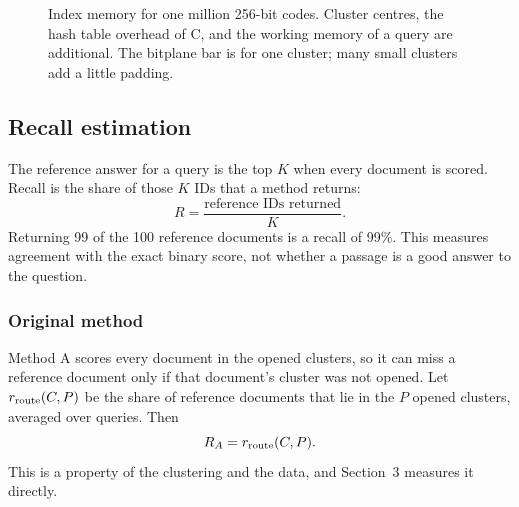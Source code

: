 \begin{figure}[H]\centering
{}
\caption{Index memory for one million 256-bit codes. Cluster centres, the hash table
overhead of C, and the working memory of a query are additional. The bitplane bar is for one
cluster; many small clusters add a little padding.}
\label{fig:memory}
\end{figure}

\subsection{Recall estimation}
The reference answer for a query is the top $K$ when every document is scored. Recall is
the share of those $K$ IDs that a method returns:
\[
 R=\frac{\text{reference IDs returned}}{K}.
\]
Returning 99 of the 100 reference documents is a recall of 99\%. This measures agreement
with the exact binary score, not whether a passage is a good answer to the question.

\subsubsection{Original method}
Method A scores every document in the opened clusters, so it can miss a reference document
only if that document's cluster was not opened. Let $r_{\rm route}(C,P)$ be the share of
reference documents that lie in the $P$ opened clusters, averaged over queries. Then
\[
 R_A=r_{\rm route}(C,P).
\]
This is a property of the clustering and the data, and Section~3 measures it directly.


